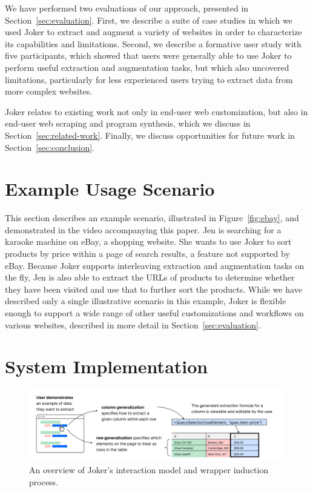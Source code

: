 \documentclass[sigconf,10pt]{acmart}
\begin{document}
We have performed two evaluations of our approach, presented in
Section~\ref{sec:evaluation}. First, we describe a suite of case studies
in which we used Joker to extract and augment a variety of websites in
order to characterize its capabilities and limitations. Second, we
describe a formative user study with five participants, which showed
that users were generally able to use Joker to perform useful extraction
and augmentation tasks, but which also uncovered limitations,
particularly for less experienced users trying to extract data from more
complex websites.

Joker relates to existing work not only in end-user web customization,
but also in end-user web scraping and program synthesis, which we
discuss in Section~\ref{sec:related-work}. Finally, we discuss
opportunities for future work in Section~\ref{sec:conclusion}.

\hypertarget{sec:examples}{%
\section{Example Usage Scenario}\label{sec:examples}}

This section describes an example scenario, illustrated in
Figure~\ref{fig:ebay}, and demonstrated in the video accompanying this
paper. Jen is searching for a karaoke machine on eBay, a shopping
website. She wants to use Joker to sort products by price within a page
of search results, a feature not supported by eBay. Because Joker
supports interleaving extraction and augmentation tasks on the fly, Jen
is also able to extract the URLs of products to determine whether they
have been visited and use that to further sort the products. While we
have described only a single illustrative scenario in this example,
Joker is flexible enough to support a wide range of other useful
customizations and workflows on various websites, described in more
detail in Section~\ref{sec:evaluation}.

\hypertarget{sec:implementation}{%
\section{System Implementation}\label{sec:implementation}}

\begin{figure}
  \includegraphics[width=\textwidth]{media/overview.png}
  \caption{\label{fig:overview}An overview of Joker's interaction model and wrapper induction process.}
\end{figure}
\end{document}
